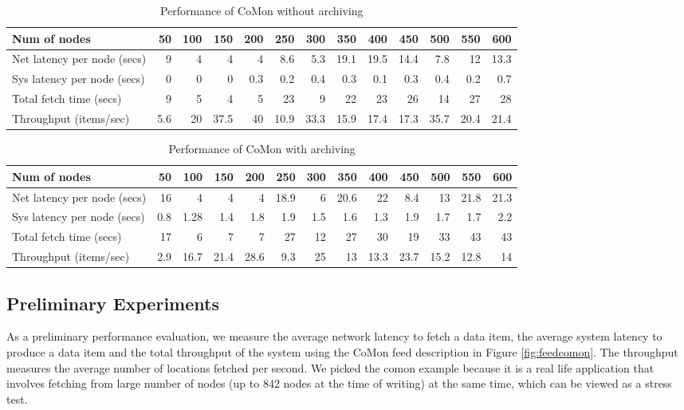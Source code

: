 \begin{table*}[th]
\begin{center}
\begin{tabular}{|l|r|r|r|r|r|r|r|r|r|r|r|r|}\hline
Num of nodes&	50&	100&	150&	200&	250&	300&	350&	400&	450&	500&	550&	600 \\ \hline\hline
Net latency per node (secs)&	9&	4&	4&	4&	8.6&	5.3&	19.1&	19.5&	14.4&	7.8&	12&	13.3 \\ \hline
Sys latency per node (secs)&	0&	0&	0&	0.3&	0.2&	0.4&	0.3&	0.1&	0.3&	0.4&	0.2&	0.7 \\ \hline
Total fetch time (secs)&	9&	5&	4&	5&	23&	9&	22&	23&	26&	14&	27&	28 \\ \hline	
Throughput (items/sec)&	5.6&	20&	37.5&	40&	10.9&	33.3&	15.9&	17.4&	17.3&	35.7&	20.4&	21.4 \\ \hline
\end{tabular}
\end{center}
\caption{Performance of CoMon without archiving}
\label{tab:comon-noarch}
\end{table*}


\begin{table*}
\begin{center}
\begin{tabular}{|l|r|r|r|r|r|r|r|r|r|r|r|r|}\hline
Num of nodes&	50&	100&	150&	200&	250&	300&	350&	400&	450&	500&	550&	600 \\ \hline\hline
Net latency per node (secs)&	16&	4&	4&	4&	18.9&	6&	20.6&	22&	8.4&	13&	21.8&	21.3 \\ \hline
Sys latency per node (secs)&	0.8&	1.28&	1.4&	1.8&	1.9&	1.5&	1.6&	1.3&	1.9&	1.7&	1.7&	2.2 \\ \hline
Total fetch time (secs)&	17&	6&	7&	7&	27&	12&	27&	30&	19&	33&	43&	43 \\ \hline
Throughput (items/sec)&	2.9&	16.7&	21.4&	28.6&	9.3&	25&	13&	13.3&	23.7&	15.2&	12.8&	14 \\ \hline
\end{tabular}
\end{center}
\caption{Performance of CoMon with archiving}
\label{tab:comon-arch}
\end{table*}

\subsection{Preliminary Experiments} \label{sec:experiments}
As a preliminary performance evaluation, 
we measure the average network latency
to fetch a data item, the average system latency 
to produce a data item
and the total throughput of the system using the CoMon feed
description in Figure \ref{fig:feedcomon}. 
The throughput measures the average
number of locations fetched per second. We picked
the comon example because it is a real life
application that involves fetching from large number of 
nodes (up to 842 nodes at the time of writing)
at the same time, which can be viewed as a stress test. 


